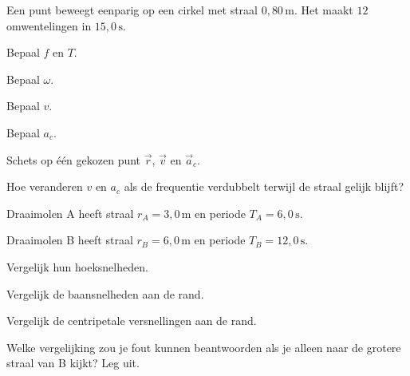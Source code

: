 \documentclass{ximera}
\begin{document}
\begin{oefening}{\oefU\ESS}

Een punt beweegt eenparig op een cirkel met straal
$0,80\,\mathrm{m}$. Het maakt $12$ omwentelingen in $15,0\,\mathrm{s}$.

\begin{question}
Bepaal $f$ en $T$.
\end{question}

\begin{question}
Bepaal $\omega$.
\end{question}

\begin{question}
Bepaal $v$.
\end{question}

\begin{question}
Bepaal $a_c$.
\end{question}

\begin{question}
Schets op één gekozen punt $\vec r$, $\vec v$ en $\vec a_c$.
\end{question}

\begin{question}
Hoe veranderen $v$ en $a_c$ als de frequentie verdubbelt terwijl de
straal gelijk blijft?
\end{question}

\end{oefening}


\begin{oefening}{\oefU\ESS}

Draaimolen A heeft straal $r_A=3,0\,\mathrm{m}$ en periode
$T_A=6,0\,\mathrm{s}$.

Draaimolen B heeft straal $r_B=6,0\,\mathrm{m}$ en periode
$T_B=12,0\,\mathrm{s}$.

\begin{question}
Vergelijk hun hoeksnelheden.
\end{question}

\begin{question}
Vergelijk de baansnelheden aan de rand.
\end{question}

\begin{question}
Vergelijk de centripetale versnellingen aan de rand.
\end{question}

\begin{question}
Welke vergelijking zou je fout kunnen beantwoorden als je alleen naar
de grotere straal van B kijkt? Leg uit.
\end{question}

\end{oefening}
\end{document}
